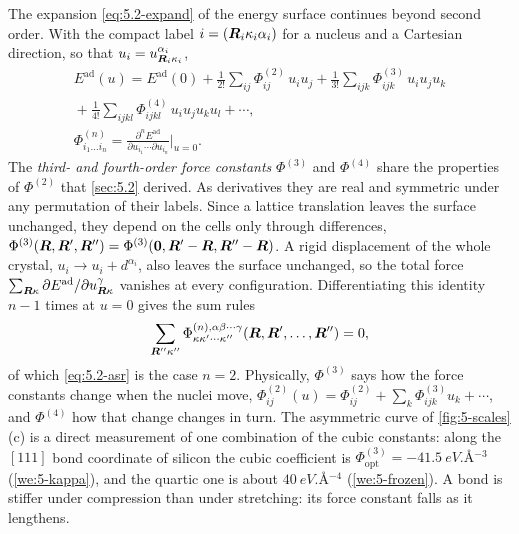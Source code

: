The expansion \cref{eq:5.2-expand} of the energy surface continues beyond second order. With the compact label $i = (\bm{R}_i\kappa_i\alpha_i)$ for a nucleus and a Cartesian direction, so that $u_i = u^{\alpha_i}_{\bm{R}_i\kappa_i}$,
\begin{equation}
  \begin{gathered}
  E^{\mathrm{ad}}(u) = E^{\mathrm{ad}}(0) + \frac{1}{2!}\sum_{ij}\Phi^{(2)}_{ij}\,u_iu_j + \frac{1}{3!}\sum_{ijk}\Phi^{(3)}_{ijk}\,u_iu_ju_k
  \\
  {} + \frac{1}{4!}\sum_{ijkl}\Phi^{(4)}_{ijkl}\,u_iu_ju_ku_l + \cdots ,
  \\
  \Phi^{(n)}_{i_1\dots i_n} = \frac{\partial^nE^{\mathrm{ad}}}{\partial u_{i_1}\cdots\partial u_{i_n}}\bigg|_{u=0} .
  \end{gathered}
  \label{eq:5.7-expand}
\end{equation}
The \emph{third- and fourth-order force constants} $\Phi^{(3)}$ and $\Phi^{(4)}$ share the properties of $\Phi^{(2)}$ that \cref{sec:5.2} derived. As derivatives they are real and symmetric under any permutation of their labels. Since a lattice translation leaves the surface unchanged, they depend on the cells only through differences, $\Phi^{(3)}(\bm{R},\bm{R}',\bm{R}'') = \Phi^{(3)}(\bm{0},\bm{R}'-\bm{R},\bm{R}''-\bm{R})$. A rigid displacement of the whole crystal, $u_i \to u_i + d^{\alpha_i}$, also leaves the surface unchanged, so the total force $\sum_{\bm{R}\kappa}\partial E^{\mathrm{ad}}/\partial u^\gamma_{\bm{R}\kappa}$ vanishes at every configuration. Differentiating this identity $n - 1$ times at $u = 0$ gives the sum rules
\begin{equation}
  \sum_{\bm{R}''\kappa''}\Phi^{(n),\alpha\beta\cdots\gamma}_{\kappa\kappa'\cdots\kappa''}(\bm{R},\bm{R}',\dots,\bm{R}'') = 0 ,
  \label{eq:5.7-asr}
\end{equation}
of which \cref{eq:5.2-asr} is the case $n = 2$. Physically, $\Phi^{(3)}$ says how the force constants change when the nuclei move, $\Phi^{(2)}_{ij}(u) = \Phi^{(2)}_{ij} + \sum_k\Phi^{(3)}_{ijk}u_k + \cdots$, and $\Phi^{(4)}$ how that change changes in turn. The asymmetric curve of \cref{fig:5-scales}(c) is a direct measurement of one combination of the cubic constants: along the $[111]$ bond coordinate of silicon the cubic coefficient is $\Phi^{(3)}_{\mathrm{opt}} = \SI{-41.5}{eV.\angstrom^{-3}}$ (\cref{we:5-kappa}), and the quartic one is about $\SI{40}{eV.\angstrom^{-4}}$ (\cref{we:5-frozen}). A bond is stiffer under compression than under stretching: its force constant falls as it lengthens.


